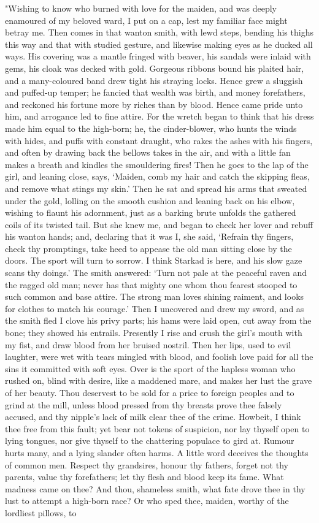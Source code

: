 \documentclass[10pt,a4paper]{report}
\begin{document}
"Wishing to know who burned with love for the maiden, and was deeply enamoured of my beloved ward, I put on a cap, lest my familiar face might betray me. Then comes in that wanton smith, with lewd steps, bending his thighs this way and that with studied gesture, and likewise making eyes as he ducked all ways. His covering was a mantle fringed with beaver, his sandals were inlaid with gems, his cloak was decked with gold. Gorgeous ribbons bound his plaited hair, and a many-coloured band drew tight his straying locks. Hence grew a sluggish and puffed-up temper; he fancied that wealth was birth, and money forefathers, and reckoned his fortune more by riches than by blood. Hence came pride unto him, and arrogance led to fine attire. For the wretch began to think that his dress made him equal to the high-born; he, the cinder-blower, who hunts the winds with hides, and puffs with constant draught, who rakes the ashes with his fingers, and often by drawing back the bellows takes in the air, and with a little fan makes a breath and kindles the smouldering fires! Then he goes to the lap of the girl, and leaning close, says, `Maiden, comb my hair and catch the skipping fleas, and remove what stings my skin.' Then he sat and spread his arms that sweated under the gold, lolling on the smooth cushion and leaning back on his elbow, wishing to flaunt his adornment, just as a barking brute unfolds the gathered coils of its twisted tail. But she knew me, and began to check her lover and rebuff his wanton hands; and, declaring that it was I, she said, `Refrain thy fingers, check thy promptings, take heed to appease the old man sitting close by the doors. The sport will turn to sorrow. I think Starkad is here, and his slow gaze scans thy doings.' The smith answered: `Turn not pale at the peaceful raven and the ragged old man; never has that mighty one whom thou fearest stooped to such common and base attire. The strong man loves shining raiment, and looks for clothes to match his courage.' Then I uncovered and drew my sword, and as the smith fled I clove his privy parts; his hams were laid open, cut away from the bone; they showed his entrails. Presently I rise and crush the girl's mouth with my fist, and draw blood from her bruised nostril. Then her lips, used to evil laughter, were wet with tears mingled with blood, and foolish love paid for all the sins it committed with soft eyes. Over is the sport of the hapless woman who rushed on, blind with desire, like a maddened mare, and makes her lust the grave of her beauty. Thou deservest to be sold for a price to foreign peoples and to grind at the mill, unless blood pressed from thy breasts prove thee falsely accused, and thy nipple's lack of milk clear thee of the crime. Howbeit, I think thee free from this fault; yet bear not tokens of suspicion, nor lay thyself open to lying tongues, nor give thyself to the chattering populace to gird at. Rumour hurts many, and a lying slander often harms. A little word deceives the thoughts of common men. Respect thy grandsires, honour thy fathers, forget not thy parents, value thy forefathers; let thy flesh and blood keep its fame. What madness came on thee? And thou, shameless smith, what fate drove thee in thy lust to attempt a high-born race? Or who sped thee, maiden, worthy of the lordliest pillows, to 
\end{document}
